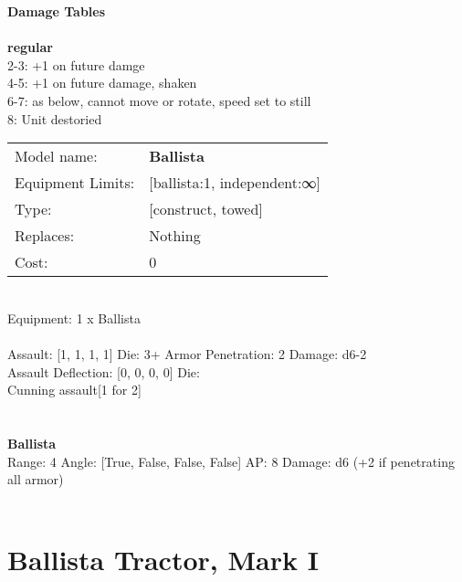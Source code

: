 {\bf Damage Tables} \\
\ \\ {\bf regular } \\
2-3: +1 on future damge \\
4-5: +1 on future damage, shaken \\
6-7: as below, cannot move or rotate, speed set to still \\
8: Unit destoried \\


\noindent
\begin{tabular}{ll}
Model name: &{\bf Ballista } \\
Equipment Limits: &[ballista:1, independent:∞] \\
Type: &[construct, towed] \\
Replaces: &Nothing \\
Cost: & 0\\
\end{tabular}
\ \\
Equipment: 1 x Ballista \\
\ \\
Assault: [1, 1, 1, 1] Die: 3+ Armor Penetration: 2 Damage: d6-2 \\
Assault Deflection: [0, 0, 0, 0] Die: \\
\indent Cunning assault[1 for 2]\\ 
 
\ \\

\ \\
{\bf Ballista } \\



Range: 4  Angle: [True, False, False, False] AP: 8 Damage: d6 (+2 if penetrating all armor) \\




 
\ \\













\clearpage

\section{ Ballista Tractor, Mark I }

